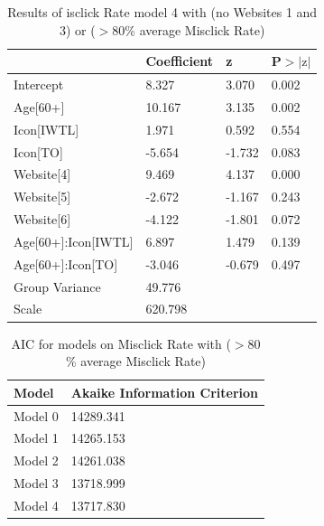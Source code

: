 \documentclass[12pt,twoside]{reedthesis}
\begin{document}
\begin{table}[h!]
        \centering
        \begin{tabular}{| p{5cm} | p{2.5cm} | p{2.5cm} | p{2.5cm} |}
            \hline
            & Coefficient & z & P$>|\text{z}|$\\
            \hline
            Intercept & 8.327 & 3.070 & 0.002\\
            \hline
            Age[60+] & 10.167 & 3.135 & 0.002\\
            \hline
            Icon[IWTL] & 1.971 & 0.592 & 0.554\\
            \hline
            Icon[TO] & -5.654 & -1.732 & 0.083\\
            \hline
            Website[4] & 9.469 & 4.137 & 0.000\\
            \hline
            Website[5] & -2.672 & -1.167 & 0.243\\
            \hline
            Website[6] & -4.122 & -1.801 & 0.072\\
            \hline
            Age[60+]:Icon[IWTL] & 6.897 & 1.479 & 0.139\\
            \hline
            Age[60+]:Icon[TO] & -3.046 & -0.679 & 0.497\\
            \hline
            Group Variance & 49.776 &&\\
            \hline
            Scale & 620.798 &&\\
            \hline
        \end{tabular}
        \caption{Results of isclick Rate model 4 with (no Websites 1 and 3) or ($>80$\% average Misclick Rate)}
    \end{table}


\begin{table}[h!]
        \centering
        \begin{tabular}{| p{3.5cm} | p{7.5cm} |}
            \hline
            Model & Akaike Information Criterion\\
            \hline
            Model 0 & 14289.341\\
            \hline
            Model 1 & 14265.153\\
            \hline
            Model 2 & 14261.038\\
            \hline
            Model 3 & 13718.999\\
            \hline
            Model 4 & 13717.830\\
            \hline
        \end{tabular}
        \caption{AIC for models on Misclick Rate with ($>80$\% average Misclick Rate)}
    \end{table}
\end{document}
